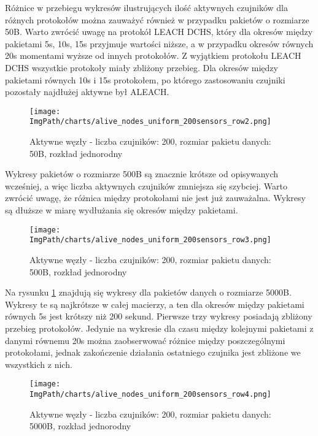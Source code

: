 Różnice w przebiegu wykresów ilustrujących ilość aktywnych czujników dla różnych protokołów można zauważyć również w przypadku pakietów o rozmiarze 50B. Warto zwrócić uwagę na protokół LEACH DCHS, który dla okresów między pakietami 5s, 10s, 15s przyjmuje wartości niższe, a w przypadku okresów równych 20s momentami wyższe od innych protokołów.  Z wyjątkiem protokołu LEACH DCHS wszystkie protokoły miały zbliżony przebieg. Dla okresów między pakietami równych 10s i 15s protokołem, po którego zastosowaniu czujniki pozostały najdłużej aktywne był ALEACH.

\begin{figure}[H]
	\begin{center}
		\texttt{[image: \\ImgPath/charts/alive\_nodes\_uniform\_200sensors\_row2.png]}
	\end{center}
	\caption{Aktywne węzły - liczba czujników: 200, rozmiar pakietu danych: 50B, rozkład jednorodny}
\end{figure}

Wykresy pakietów o rozmiarze 500B są znacznie krótsze od opisywanych wcześniej, a więc liczba aktywnych czujników zmniejsza się szybciej. Warto zwrócić uwagę, że różnica między protokołami nie jest już zauważalna. Wykresy są dłuższe w miarę wydłużania się okresów między pakietami.

\begin{figure}[H]
	\begin{center}
		\texttt{[image: \\ImgPath/charts/alive\_nodes\_uniform\_200sensors\_row3.png]}
	\end{center}
	\caption{Aktywne węzły - liczba czujników: 200, rozmiar pakietu danych: 500B, rozkład jednorodny}
\end{figure}

Na rysunku \ref{fig:aliveNodesUniform200sensorsRow4} znajdują się wykresy dla pakietów danych o rozmiarze 5000B. Wykresy te są najkrótsze w całej macierzy, a ten dla okresów między pakietami równych 5s jest krótszy niż 200 sekund. Pierwsze trzy wykresy posiadają zbliżony przebieg protokołów. Jedynie na wykresie dla czasu między kolejnymi pakietami z danymi równemu 20s można zaobserwować różnice między poszczególnymi protokołami, jednak zakończenie działania ostatniego czujnika jest zbliżone we wszystkich z nich.

\begin{figure}[H]
	\begin{center}
		\texttt{[image: \\ImgPath/charts/alive\_nodes\_uniform\_200sensors\_row4.png]}
	\end{center}
	\caption{Aktywne węzły - liczba czujników: 200, rozmiar pakietu danych: 5000B, rozkład jednorodny}
	\label{fig:aliveNodesUniform200sensorsRow4}
\end{figure}

